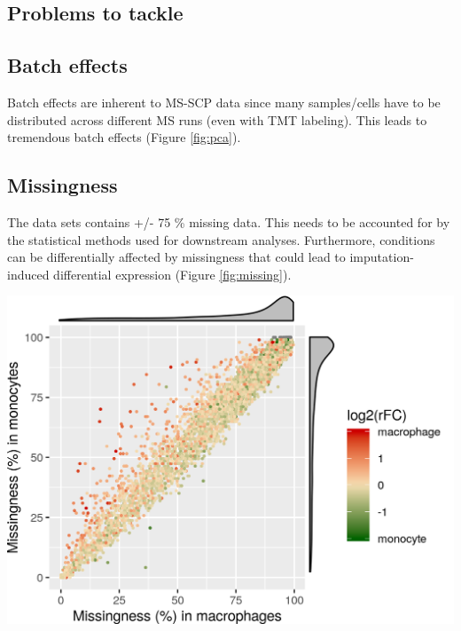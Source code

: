 \documentclass{article}
\begin{document}
\begin{multicols}{2}
\noindent
\begin{minipage}[t]{\linewidth}
  \vspace{0.55cm}
  \section*{\huge Problems to tackle}
  \subsection*{Batch effects}
  \large
  Batch effects are inherent to MS-SCP data since many samples/cells have to be distributed across different MS runs (even with TMT labeling). This leads to tremendous batch effects (Figure \ref{fig:pca}).
  
\end{minipage}
  
\noindent
\begin{minipage}[h]{0.37\linewidth}
  \subsection*{Missingness}
  \large
  The \cite{Specht2019-jm} data sets contains +/- 75 \% missing data. This needs to be accounted for by the statistical methods used for downstream analyses. Furthermore, conditions can be differentially affected by missingness that could lead to imputation-induced differential expression (Figure \ref{fig:missing}).

\end{minipage}
\hspace{0.4cm}
\begin{minipage}[h]{0.6\linewidth}
  \begin{center}
    \includegraphics[width=\linewidth]{figs/missing.png}
  \end{center}
\end{minipage}


\end{multicols}
\end{document}
